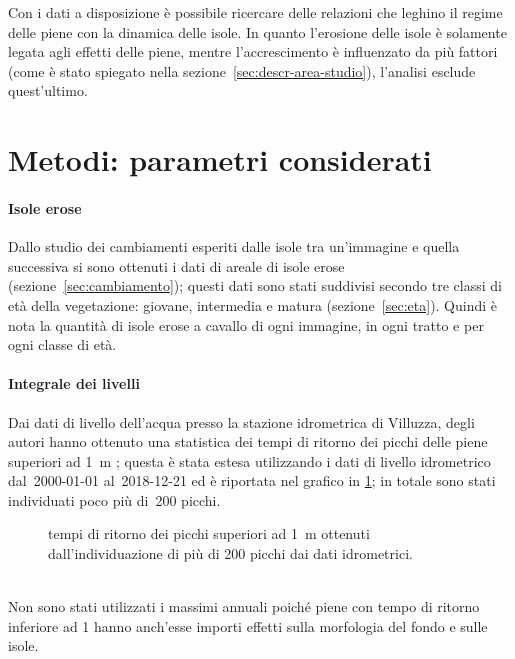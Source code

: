 Con i dati a disposizione è possibile ricercare delle relazioni che leghino il regime delle piene con la dinamica delle isole.
In quanto l'erosione delle isole è solamente legata agli effetti delle piene, mentre l'accrescimento è influenzato da più fattori (come è stato spiegato nella sezione~\ref{sec:descr-area-studio}), l'analisi esclude quest'ultimo.

\section{Metodi: parametri considerati}

\paragraph{Isole erose}
Dallo studio dei cambiamenti esperiti dalle isole tra un'immagine e quella successiva si sono ottenuti i dati di areale di isole erose (sezione~\ref{sec:cambiamento});
questi dati sono stati suddivisi secondo tre classi di età della vegetazione: giovane, intermedia e matura (sezione~\ref{sec:eta}).
Quindi è nota la quantità di isole erose a cavallo di ogni immagine, in ogni tratto e per ogni classe di età.

\paragraph{Integrale dei livelli}
Dai dati di livello dell'acqua presso la stazione idrometrica di Villuzza, degli autori hanno ottenuto una statistica dei tempi di ritorno dei picchi delle piene superiori ad \SI{1}{\m} ; questa è stata estesa utilizzando i dati di livello idrometrico dal~2000-01-01 al~2018-12-21 ed è riportata nel grafico in \cref{graph:tr-picchi}; in totale sono stati individuati poco più di~200 picchi.
%
\begin{figure}
	\centering
	
	\caption[tempi di ritorno dei picchi superiori ad \SI{1}{\m}]{tempi di ritorno dei picchi superiori ad \SI{1}{\m} ottenuti dall'individuazione di più di 200 picchi dai dati idrometrici.}
	\label{graph:tr-picchi}
\end{figure}
%
\\
Non sono stati utilizzati i massimi annuali poiché piene con tempo di ritorno inferiore ad \SI{1}{\anno} hanno anch'esse importi effetti sulla morfologia del fondo e sulle isole.

